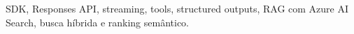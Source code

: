 
SDK, Responses API, streaming, tools, structured outputs, RAG com Azure AI Search, busca híbrida e ranking semântico.


